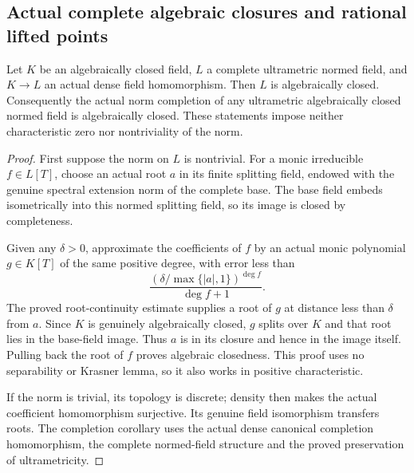 \subsection{Actual complete algebraic closures and rational lifted points}
\label{subsec:complete-algebraic-closures}

\begin{theorem}
\label{spectrum:algebraic-closed-dense-completion}
\leanok
Let $K$ be an algebraically closed field, $L$ a complete ultrametric
normed field, and $K\to L$ an actual dense field homomorphism. Then $L$
is algebraically closed. Consequently the actual norm completion of any
ultrametric algebraically closed normed field is algebraically closed.
These statements impose neither characteristic zero nor nontriviality
of the norm.
\end{theorem}
\begin{proof}
First suppose the norm on $L$ is nontrivial. For a monic irreducible
$f\in L[T]$, choose an actual root $a$ in its finite splitting field,
endowed with the genuine spectral extension norm of the complete base.
The base field embeds isometrically into this normed splitting field,
so its image is closed by completeness.

Given any $\delta>0$, approximate the coefficients of $f$ by an actual
monic polynomial $g\in K[T]$ of the same positive degree, with error less
than
\[
 \frac{(\delta/\max\{|a|,1\})^{\deg f}}{\deg f+1}.
\]
The proved root-continuity estimate supplies a root of $g$ at distance
less than $\delta$ from $a$. Since $K$ is genuinely algebraically closed,
$g$ splits over $K$ and that root lies in the base-field image. Thus $a$
is in its closure and hence in the image itself. Pulling back the root
of $f$ proves algebraic closedness. This proof uses no separability or
Krasner lemma, so it also works in positive characteristic.

If the norm is trivial, its topology is discrete; density then makes the
actual coefficient homomorphism surjective. Its genuine field isomorphism
transfers roots. The completion corollary uses the actual dense canonical
completion homomorphism, the complete normed-field structure and the
proved preservation of ultrametricity.
\end{proof}


